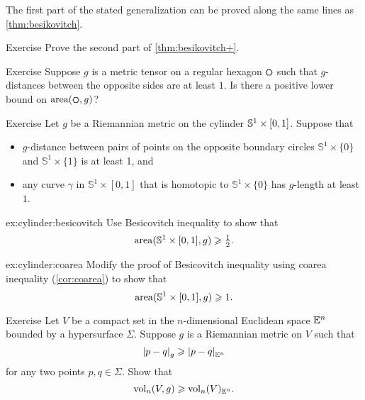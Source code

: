 The first part of the stated generalization can be proved along the same lines as \ref{thm:besikovitch}.

\begin{thm}{Exercise}\label{ex:besikovitch=}
Prove the second part of \ref{thm:besikovitch+}.
\end{thm}


\begin{thm}{Exercise}\label{ex:hexagon}
Suppose $g$ is a metric tensor on a regular hexagon $\textbf{\hexagon}$ such that $g$-distances between the opposite sides are at least $1$.
Is there a positive lower bound on $\area(\textbf{\hexagon},g)$?
\end{thm}

\begin{thm}{Exercise}\label{ex:cylinder}
Let $g$ be a Riemannian metric on the cylinder $\mathbb{S}^1\z\times [0,1]$.
Suppose that 
\begin{itemize}
\item 
$g$-distance between pairs of points on the opposite boundary circles $\mathbb{S}^1\times\{0\}$ and $\mathbb{S}^1\times\{1\}$ is at least 1, and 
\item
any curve $\gamma$ in $\mathbb{S}^1\times [0,1]$ that is homotopic to $\mathbb{S}^1\times\{0\}$ has $g$-length at least $1$.
\end{itemize}

\begin{subthm}{ex:cylinder:besicovitch}
Use Besicovitch inequality to show that
\[\operatorname{\rm area}\nolimits(\mathbb{S}^1\times [0,1],g)\geqslant \tfrac12.\]

\end{subthm}

\begin{subthm}{ex:cylinder:coarea}
 Modify the proof of Besicovitch inequality using coarea inequality (\ref{cor:coarea}) to show that \[\operatorname{\rm area}\nolimits(\mathbb{S}^1\times [0,1],g)\geqslant 1.\]
 
\end{subthm}

\end{thm}


\begin{thm}{Exercise}\label{ex:gadograph}
Let $V$ be a compact set in the $n$-dimensional Euclidean space $\mathbb{E}^n$ bounded by a hypersurface $\Sigma$.
Suppose $g$ is a Riemannian metric on $V$ such that 
\[\dist{p}{q}{g}\ge\dist{p}{q}{\EE^n}\]
for any two points $p,q\in \Sigma$.
Show that
\[\operatorname{\rm vol}\nolimits_n(V,g)\geqslant \operatorname{\rm vol}\nolimits_n(V)_{\mathbb{E}^n}.\]
 
\end{thm}

